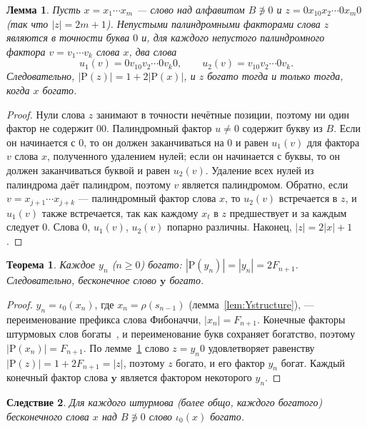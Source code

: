 \documentclass[a4paper,14pt]{extreport}
\theoremstyle{plain}
\newtheorem{theorem}{Теорема}[section]
\newtheorem{lemma}{Лемма}[section]
\newtheorem{corollary}[theorem]{Следствие}
\theoremstyle{definition}
\theoremstyle{remark}
\begin{document}
\begin{lemma}\label{lem:insertcount}
	Пусть $x=x_1\cdots x_m$ --- слово над алфавитом $B\not\ni0$ и $z=0x_10x_2\cdots0x_m0$ (так что $|z|=2m+1$).
	Непустыми палиндромными факторами слова $z$ являются в точности буква $0$ и, для каждого непустого палиндромного фактора
	$v=v_1\cdots v_k$ слова $x$, два слова
	\begin{equation}
		u_1(v)=0v_10v_2\cdots0v_k0,\qquad u_2(v)=v_10v_2\cdots0v_k .
	\end{equation}
	Следовательно, $|\mathrm P(z)|=1+2|\mathrm P(x)|$, и $z$ богато тогда и только тогда, когда $x$ богато.
\end{lemma}
\begin{proof}
	Нули слова $z$ занимают в точности нечётные позиции, поэтому ни один фактор не содержит $00$.
	Палиндромный фактор $u\ne0$ содержит букву из $B$. Если он начинается с $0$, то он должен заканчиваться на $0$ и равен
	$u_1(v)$ для фактора $v$ слова $x$, полученного удалением нулей; если он начинается с буквы, то он должен заканчиваться буквой
	и равен $u_2(v)$. Удаление всех нулей из палиндрома даёт палиндром, поэтому $v$ является палиндромом. Обратно, если $v=x_{j+1}\cdots x_{j+k}$ --- палиндромный фактор слова $x$,
	то $u_2(v)$ встречается в $z$, и $u_1(v)$ также встречается, так как каждому $x_t$ в $z$ предшествует и за каждым следует $0$.
	Слова $0$, $u_1(v)$, $u_2(v)$ попарно различны. Наконец, $|z|=2|x|+1$.
\end{proof}

\begin{theorem}\label{thm:Yrich}
	Каждое $y_n$ ($n\ge0$) богато: $|\mathrm P(y_n)|=|y_n|=2F_{n+1}$. Следовательно, бесконечное слово $\mathbf y$ богато.
\end{theorem}
\begin{proof}
	$y_n=\iota_0(x_n)$, где $x_n=\rho(s_{n-1})$ (лемма~\ref{lem:Ystructure}), --- переименование префикса слова Фибоначчи, $|x_n|=F_{n+1}$.
	Конечные факторы штурмовых слов богаты~\cite{Droubay}, и переименование букв сохраняет богатство, поэтому $|\mathrm P(x_n)|=F_{n+1}$.
	По лемме~\ref{lem:insertcount} слово $z=y_n0$ удовлетворяет равенству $|\mathrm P(z)|=1+2F_{n+1}=|z|$, поэтому $z$ богато, и его фактор $y_n$ богат.
	Каждый конечный фактор слова $\mathbf y$ является фактором некоторого $y_n$.
\end{proof}

\begin{corollary}
	Для каждого штурмова (более общо, каждого богатого) бесконечного слова $x$ над $B\not\ni0$ слово $\iota_0(x)$ богато.
\end{corollary}
\end{document}
